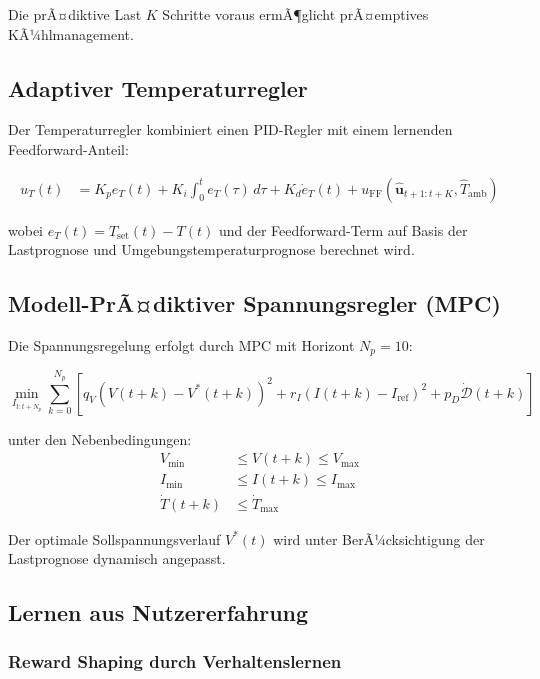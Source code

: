 ﻿\documentclass[12pt,a4paper]{article}
\begin{document}
	Die prÃ¤diktive Last $K$ Schritte voraus ermÃ¶glicht prÃ¤emptives KÃ¼hlmanagement.
	
	\subsection{Adaptiver Temperaturregler}
	
	Der Temperaturregler kombiniert einen PID-Regler mit einem lernenden Feedforward-Anteil:
	
	\begin{align}
		u_T(t) &= K_p e_T(t) + K_i \int_0^t e_T(\tau)\,d\tau + K_d \dot{e}_T(t)
		+ u_\mathrm{FF}(\hat{\mathbf{u}}_{t+1:t+K}, \hat{T}_\mathrm{amb})
		\label{eq:pid_controller}
	\end{align}
	
	wobei $e_T(t) = T_\mathrm{set}(t) - T(t)$ und der Feedforward-Term auf Basis
	der Lastprognose und Umgebungstemperaturprognose berechnet wird.
	
	\subsection{Modell-PrÃ¤diktiver Spannungsregler (MPC)}
	
	Die Spannungsregelung erfolgt durch MPC mit Horizont $N_p = 10$:
	
	\begin{equation}
		\min_{I_{t:t+N_p}} \sum_{k=0}^{N_p} \left[
		q_V (V(t+k) - V^*(t+k))^2 + r_I (I(t+k) - I_\mathrm{ref})^2
		+ p_D \dot{\mathcal{D}}(t+k)
		\right]
		\label{eq:mpc_cost}
	\end{equation}
	
	unter den Nebenbedingungen:
	\begin{align}
		V_\mathrm{min} &\leq V(t+k) \leq V_\mathrm{max} \\
		I_\mathrm{min} &\leq I(t+k) \leq I_\mathrm{max} \\
		\dot{T}(t+k) &\leq \dot{T}_\mathrm{max}
	\end{align}
	
	Der optimale Sollspannungsverlauf $V^*(t)$ wird unter BerÃ¼cksichtigung der
	Lastprognose dynamisch angepasst.
	
	\subsection{Lernen aus Nutzererfahrung}
	
	\subsubsection{Reward Shaping durch Verhaltenslernen}
	
\end{document}
